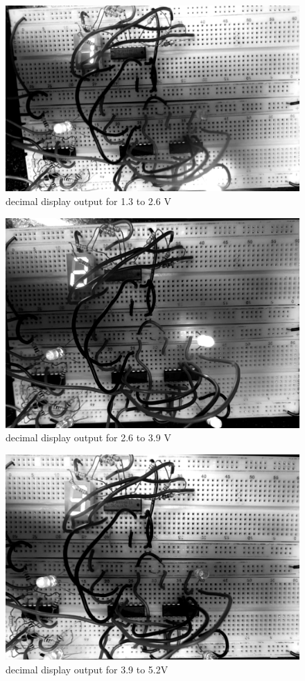 		\begin{figure}[H]
			\centering
			\label{photo:6}
			\includegraphics[width=0.6\columnwidth]{images/_1.png}
			\caption{decimal display output for 1.3 to 2.6 V}
		\end{figure}
		\begin{figure}[H]
			\centering
			\label{photo:7}
			\includegraphics[width=0.6\columnwidth]{images/_2.png}
			\caption{decimal display output for 2.6 to 3.9 V}
		\end{figure}
		\begin{figure}[H]
			\centering
			\label{photo:8}
			\includegraphics[width=0.6\columnwidth]{images/_3.png}
			\caption{decimal display output for 3.9 to 5.2V}
		\end{figure}
